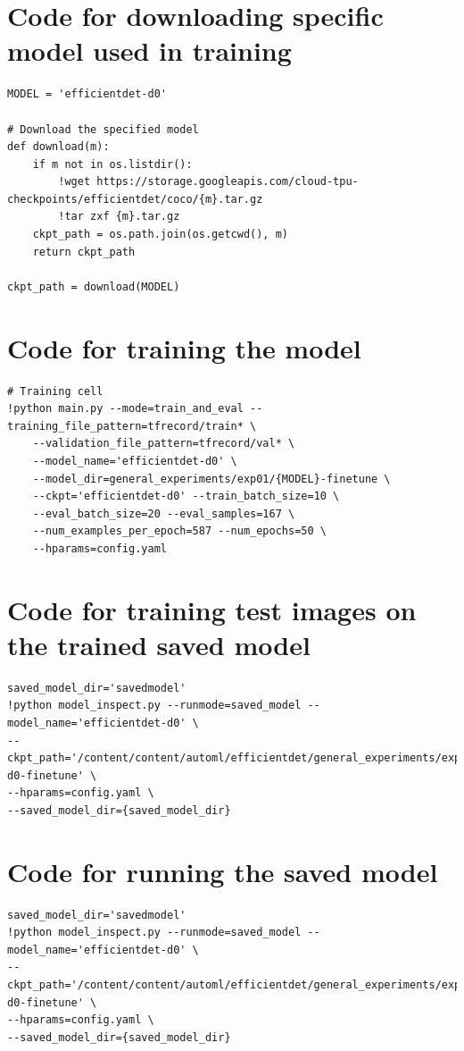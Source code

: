 \documentclass[12pt]{report}
\begin{document}
\section{Code for downloading specific model used in training}
\begin{lstlisting}
MODEL = 'efficientdet-d0'

# Download the specified model
def download(m):
    if m not in os.listdir():
        !wget https://storage.googleapis.com/cloud-tpu-checkpoints/efficientdet/coco/{m}.tar.gz
        !tar zxf {m}.tar.gz
    ckpt_path = os.path.join(os.getcwd(), m)
    return ckpt_path

ckpt_path = download(MODEL)
\end{lstlisting}

\section{Code for training the model}
\begin{lstlisting}
# Training cell
!python main.py --mode=train_and_eval --training_file_pattern=tfrecord/train* \
    --validation_file_pattern=tfrecord/val* \
    --model_name='efficientdet-d0' \
    --model_dir=general_experiments/exp01/{MODEL}-finetune \
    --ckpt='efficientdet-d0' --train_batch_size=10 \
    --eval_batch_size=20 --eval_samples=167 \
    --num_examples_per_epoch=587 --num_epochs=50 \
    --hparams=config.yaml
\end{lstlisting}

\section{Code for training test images on the trained saved model}
\begin{lstlisting}
saved_model_dir='savedmodel'
!python model_inspect.py --runmode=saved_model --model_name='efficientdet-d0' \
--ckpt_path='/content/content/automl/efficientdet/general_experiments/exp01/efficientdet-d0-finetune' \
--hparams=config.yaml \
--saved_model_dir={saved_model_dir}
\end{lstlisting}

\section{Code for running the saved model}
\begin{lstlisting}
saved_model_dir='savedmodel'
!python model_inspect.py --runmode=saved_model --model_name='efficientdet-d0' \
--ckpt_path='/content/content/automl/efficientdet/general_experiments/exp01/efficientdet-d0-finetune' \
--hparams=config.yaml \
--saved_model_dir={saved_model_dir}
\end{lstlisting}
\end{document}
